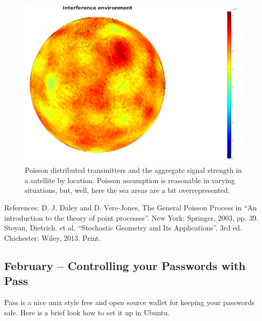 \documentclass{article}
\begin{document}
\begin{figure}
  \includegraphics[width=\linewidth]{interferenceenvironment.png}
  \caption{Poisson distributed transmitters and the aggregate signal strength in a satellite by location. Poisson assumption is reasonable in varying situations, but, well, here the sea areas are a bit overrepresented.  }
\end{figure}

References:
 D. J. Daley and D. Vere-Jones, The General Poisson Process in  ``An introduction to the theory of point processes''. New York: Springer, 2003, pp. 39. 
 Stoyan, Dietrich. et al. ``Stochastic Geometry and Its Applications''. 3rd ed. Chichester: Wiley, 2013. Print.




\subsection{February – Controlling your Passwords with Pass}
Pass is a nice unix style free and open source wallet for keeping your passwords safe. Here is a brief look how to set it up in Ubuntu.
\end{document}
